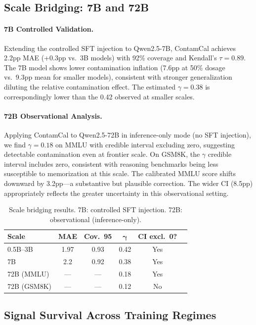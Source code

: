 \documentclass[11pt,letterpaper]{article}
\begin{document}
\subsection{Scale Bridging: 7B and 72B}

\paragraph{7B Controlled Validation.}
Extending the controlled SFT injection to Qwen2.5-7B, ContamCal achieves 2.2pp MAE (+0.3pp vs.\ 3B models) with 92\% coverage and Kendall's $\tau = 0.89$.
The 7B model shows lower contamination inflation (7.6pp at 50\% dosage vs.\ 9.3pp mean for smaller models), consistent with stronger generalization diluting the relative contamination effect.
The estimated $\gamma = 0.38$ is correspondingly lower than the 0.42 observed at smaller scales.

\paragraph{72B Observational Analysis.}
Applying ContamCal to Qwen2.5-72B in inference-only mode (no SFT injection), we find $\gamma = 0.18$ on MMLU with credible interval excluding zero, suggesting detectable contamination even at frontier scale.
On GSM8K, the $\gamma$ credible interval includes zero, consistent with reasoning benchmarks being less susceptible to memorization at this scale.
The calibrated MMLU score shifts downward by 3.2pp---a substantive but plausible correction.
The wider CI (8.5pp) appropriately reflects the greater uncertainty in this observational setting.

\begin{table}[t]
\centering
\caption{Scale bridging results. 7B: controlled SFT injection. 72B: observational (inference-only).}
\label{tab:scale}
\begin{tabular}{lccccc}
\toprule
\textbf{Scale} & \textbf{MAE} & \textbf{Cov.\ 95} & $\boldsymbol{\gamma}$ & \textbf{CI excl.\ 0?} \\
\midrule
0.5B--3B & 1.97 & 0.93 & 0.42 & Yes \\
7B & 2.2 & 0.92 & 0.38 & Yes \\
72B (MMLU) & --- & --- & 0.18 & Yes \\
72B (GSM8K) & --- & --- & 0.12 & No \\
\bottomrule
\end{tabular}
\end{table}

\subsection{Signal Survival Across Training Regimes}
\end{document}
